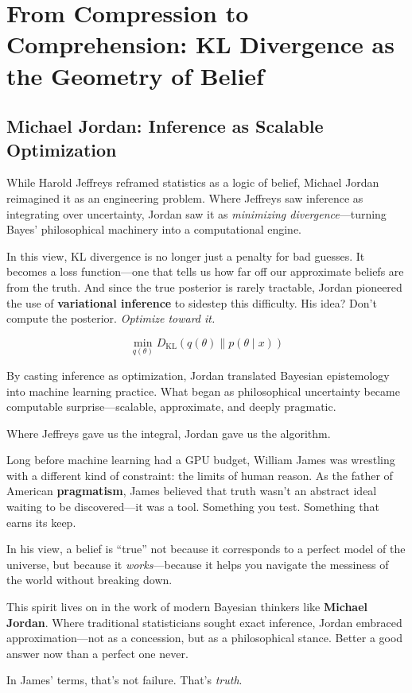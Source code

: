 \section{From Compression to Comprehension: KL Divergence as the Geometry of Belief}

\subsection{Michael Jordan: Inference as Scalable Optimization}

While Harold Jeffreys reframed statistics as a logic of belief, Michael Jordan reimagined it as an engineering problem. Where Jeffreys saw inference as integrating over uncertainty, Jordan saw it as \emph{minimizing divergence}—turning Bayes’ philosophical machinery into a computational engine.

In this view, KL divergence is no longer just a penalty for bad guesses. It becomes a loss function—one that tells us how far off our approximate beliefs are from the truth. And since the true posterior is rarely tractable, Jordan pioneered the use of \textbf{variational inference} to sidestep this difficulty. His idea? Don’t compute the posterior. \emph{Optimize toward it.}

\[
\min_{q(\theta)} D_{\mathrm{KL}}(q(\theta) \parallel p(\theta \mid x))
\]

By casting inference as optimization, Jordan translated Bayesian epistemology into machine learning practice. What began as philosophical uncertainty became computable surprise—scalable, approximate, and deeply pragmatic.

Where Jeffreys gave us the integral, Jordan gave us the algorithm.


\begin{tcolorbox}[colback=blue!5!white,colframe=blue!50!black,title=William James and the Ethics of Approximation]
    Long before machine learning had a GPU budget, William James was wrestling with a different kind of constraint: the limits of human reason. As the father of American \textbf{pragmatism}, James believed that truth wasn’t an abstract ideal waiting to be discovered—it was a tool. Something you test. Something that earns its keep.
    
    In his view, a belief is “true” not because it corresponds to a perfect model of the universe, but because it \emph{works}—because it helps you navigate the messiness of the world without breaking down.
    
    This spirit lives on in the work of modern Bayesian thinkers like \textbf{Michael Jordan}. Where traditional statisticians sought exact inference, Jordan embraced approximation—not as a concession, but as a philosophical stance. Better a good answer now than a perfect one never.
    
    In James’ terms, that’s not failure. That’s \emph{truth}.
\end{tcolorbox}



